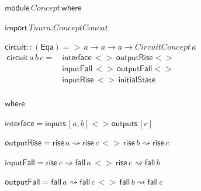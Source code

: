 \documentclass[british,compsoc]{IEEEtran}
\begin{document}
\begin{minipage}[t]{1\columnwidth}%
\begin{flushleft}
$\,\mathsf{module}\, Concept \, \mathsf{where}$
\par\end{flushleft}

\begin{flushleft}
$\,\mathsf{import}\, Tuura.ConceptConcat$
\par\end{flushleft}

\begin{flushleft}
$\,\mathsf{circuit :: (Eq a) =>}\, a \rightarrow a \rightarrow  a \rightarrow  CircuitConcept\,a$
$\begin{aligned}\mathsf{circuit}\,a \,b \,c=&\mathsf{\,interface}\,<> \mathsf{\, outputRise}<>\\
&\,\mathsf{inputFall}\,<>\,\mathsf{outputFall}<>\\
&\mathsf{\, inputRise}\,<>\,\mathsf{initialState}\\
\end{aligned}
$

$\,\mathsf{where}$
\par\end{flushleft}

\begin{flushleft}
$\,\mathsf{interface}=\mathsf{inputs}\,[a,b]<>\mathsf{outputs}\,[c]$
\par\end{flushleft}

\begin{flushleft}
$\,\mathsf{outputRise}=\mathsf{rise} \,a\rightsquigarrow \mathsf{rise} \,c\,<>\, \mathsf{rise} \,b\rightsquigarrow \mathsf{rise} \,c$
\par\end{flushleft}

\begin{flushleft}
$\,\mathsf{inputFall}=\mathsf{rise} \,c\rightsquigarrow \mathsf{fall} \,a \,<>\, \mathsf{rise} \,c \rightsquigarrow \mathsf{fall} \,b$
\par\end{flushleft}

\begin{flushleft}
$\,\mathsf{outputFall}=\mathsf{fall} \,a \rightsquigarrow \mathsf{fall} \,c \,<>\, \mathsf{fall} \,b \rightsquigarrow \mathsf{fall} \,c$
\par\end{flushleft}


\end{minipage}
\end{document}
